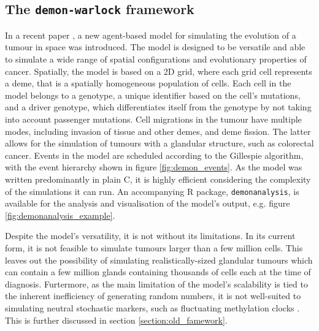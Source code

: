 \subsection{The \texttt{demon-warlock} framework}
In a recent paper \cite{bak_warlock_2023}, a new agent-based model for simulating the evolution of a tumour in space
was introduced. The model is designed to be versatile and able to simulate a wide range of
spatial configurations and evolutionary properties of cancer. Spatially, the model is based on a 2D grid, where
each grid cell represents a deme, that is a spatially homogeneous population of cells. Each cell in the model
belongs to a genotype, a unique identifier based on the cell's mutations, and a driver genotype, which differentiates
itself from the genotype by not taking into account passenger mutations. Cell migrations in the tumour have multiple
modes, including invasion of tissue and other demes, and deme fission. The latter allows for the simulation of
tumours with a glandular structure, such as colorectal cancer. Events in the model are scheduled according to the
Gillespie algorithm, with the event hierarchy shown in figure \ref{fig:demon_events}. As the model was written
predominantly in plain C, it is highly efficient considering the complexity of the simulations it can run. An
accompanying R package, \texttt{demonanalysis}, is available for the analysis and visualisation of the model's
output, e.g. figure \ref{fig:demonanalysis_example}. \par
Despite the model's versatility, it is not without its limitations. In its current form, it is not feasible to
simulate tumours larger than a few million cells. This leaves out the possibility of simulating realistically-sized
glandular tumours which can contain a few million glands containing thousands of cells each at the time of diagnosis.
Furtermore, as the main limitation of the model's scalability is tied to the inherent inefficiency of generating
random numbers, it is not well-suited to simulating neutral stochastic markers, such as fluctuating methylation
clocks \cite{gabbutt_fluctuating_2022}. This is further discussed in section \ref{section:old_famework}.

